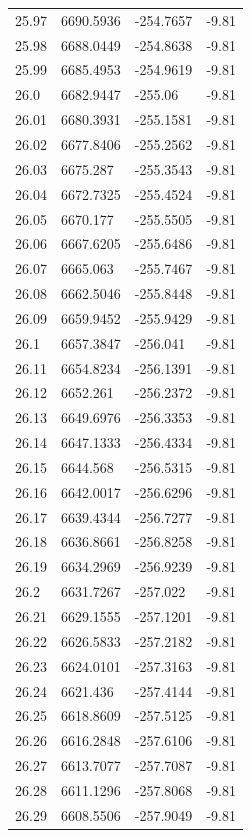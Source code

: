 \begin{table}[H]
\begin{tabular}{llll}
25.97 & 6690.5936 & -254.7657 & -9.81 \\
25.98 & 6688.0449 & -254.8638 & -9.81 \\
25.99 & 6685.4953 & -254.9619 & -9.81 \\
26.0 & 6682.9447 & -255.06 & -9.81 \\
26.01 & 6680.3931 & -255.1581 & -9.81 \\
26.02 & 6677.8406 & -255.2562 & -9.81 \\
26.03 & 6675.287 & -255.3543 & -9.81 \\
26.04 & 6672.7325 & -255.4524 & -9.81 \\
26.05 & 6670.177 & -255.5505 & -9.81 \\
26.06 & 6667.6205 & -255.6486 & -9.81 \\
26.07 & 6665.063 & -255.7467 & -9.81 \\
26.08 & 6662.5046 & -255.8448 & -9.81 \\
26.09 & 6659.9452 & -255.9429 & -9.81 \\
26.1 & 6657.3847 & -256.041 & -9.81 \\
26.11 & 6654.8234 & -256.1391 & -9.81 \\
26.12 & 6652.261 & -256.2372 & -9.81 \\
26.13 & 6649.6976 & -256.3353 & -9.81 \\
26.14 & 6647.1333 & -256.4334 & -9.81 \\
26.15 & 6644.568 & -256.5315 & -9.81 \\
26.16 & 6642.0017 & -256.6296 & -9.81 \\
26.17 & 6639.4344 & -256.7277 & -9.81 \\
26.18 & 6636.8661 & -256.8258 & -9.81 \\
26.19 & 6634.2969 & -256.9239 & -9.81 \\
26.2 & 6631.7267 & -257.022 & -9.81 \\
26.21 & 6629.1555 & -257.1201 & -9.81 \\
26.22 & 6626.5833 & -257.2182 & -9.81 \\
26.23 & 6624.0101 & -257.3163 & -9.81 \\
26.24 & 6621.436 & -257.4144 & -9.81 \\
26.25 & 6618.8609 & -257.5125 & -9.81 \\
26.26 & 6616.2848 & -257.6106 & -9.81 \\
26.27 & 6613.7077 & -257.7087 & -9.81 \\
26.28 & 6611.1296 & -257.8068 & -9.81 \\
26.29 & 6608.5506 & -257.9049 & -9.81 \\

\end{tabular}
\end{table}
